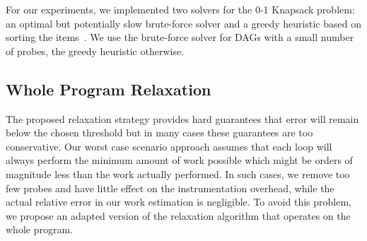 



For our experiments, we implemented two solvers for the 0-1 Knapsack problem: an optimal but potentially slow brute-force solver and a
greedy heuristic based on sorting the items~\citep{dantzig57}. We use the brute-force solver for DAGs with a small number of probes, the
greedy heuristic otherwise.

\subsection{Whole Program Relaxation}

The proposed relaxation strategy provides hard guarantees that error will remain below the chosen threshold but in many cases these
guarantees are too conservative. Our worst case scenario approach assumes that each loop will always perform the minimum amount of work
possible which might be orders of magnitude less than the work actually performed. In such cases, we remove too few probes and have little
effect on the instrumentation overhead, while the actual relative error in our work estimation is negligible. To avoid this problem, we
propose an adapted version of the relaxation algorithm that operates on the whole program.

